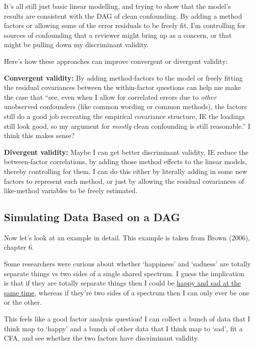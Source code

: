 \documentclass[
  letterpaper,
  DIV=11,
  numbers=noendperiod]{scrreprt}
\begin{document}
It's all still just basic linear modelling, and trying to show that the
model's results are consistent with the DAG of clean confounding. By
adding a method factors or allowing some of the error residuals to be
freely fit, I'm controlling for sources of confounding that a reviewer
might bring up as a concern, or that might be pulling down my
discriminant validity.

Here's how these approaches can improve convergent or divergent
validity:

\textbf{Convergent validity:} By adding method-factors to the model or
freely fitting the residual covariances between the within-factor
questions can help me make the case that ``see, even when I allow for
correlated errors due to \emph{other} unobserved confounders (like
common wording or common methods), the factors still do a good job
recreating the empirical covariance structure, IE the loadings still
look good, so my argument for \emph{mostly} clean confounding is still
reasonable.'' I think this makes sense?

\textbf{Divergent validity:} Maybe I can get better discriminant
validity, IE reduce the between-factor correlations, by adding those
method effects to the linear models, thereby controlling for them. I can
do this either by literally adding in some new factors to represent each
method, or just by allowing the residual covariances of like-method
variables to be freely estimated.

\hypertarget{simulating-data-based-on-a-dag}{%
\subsection*{Simulating Data Based on a
DAG}\label{simulating-data-based-on-a-dag}}

Now let's look at an example in detail. This example is taken from Brown
(2006), chapter 6.

Some researchers were curious about whether `happiness' and `sadness'
are totally separate things vs two sides of a single shared spectrum. I
guess the implication is that if they are totally separate things then I
could be \href{https://www.youtube.com/watch?v=U5oIvfraRrU}{happy and
sad at the same time}, whereas if they're two sides of a spectrum then I
can only ever be one or the other.

This feels like a good factor analysis question! I can collect a bunch
of data that I think map to `happy' and a bunch of other data that I
think map to `sad', fit a CFA, and see whether the two factors have
discriminant validity.
\end{document}

